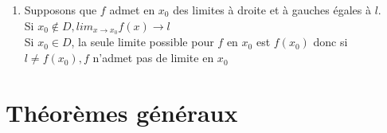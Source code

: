 \documentclass[fleqn]{article}
\theoremstyle{definition} \newtheorem*{defi}{D\'efinition}
\theoremstyle{definition} \newtheorem*{theo}{Th\'eor\`eme}
\theoremstyle{definition} \newtheorem*{adh}{Caract\'erisation s\'equentielle de l'adh\'erence}
\theoremstyle{remark} \newtheorem*{rqs}{Remarques}
\begin{document}
\begin{enumerate}
\begin{enumerate}
\begin{rqs}
					Si $f$ n'a pas de limite \`a droite (resp. gauche) en $x_0, f$ n'a pas de limite en $x_0$. \\
					Si $f$ admet en $x_0$ des limites \`a droite et \`a gauche diff\'erentes, $f$ n'a pas de limite en $x_0$
				\end{rqs}
			\item Supposons que $f$ admet en $x_0$ des limites \`a droite et \`a gauches \'egales \`a $l$. \\
				Si $x_0 \notin D, lim_{x \to x_0} f(x) \rightarrow l$ \\
				Si $x_0 \in D$, la seule limite possible pour $f$ en $x_0$ est $f(x_0)$ donc si $l \neq f(x_0), f$ n'admet pas de limite
				en $x_0$
		\end{enumerate}
\end{enumerate}

\section{Th\'eor\`emes g\'en\'eraux}
\end{document}
